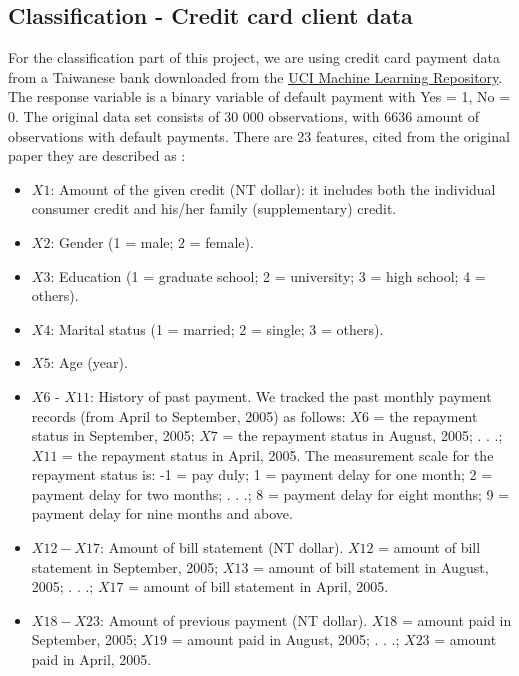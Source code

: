 \documentclass[a4paper, 11pt, twocolumn]{article}
\begin{document}
\subsection{Classification - Credit card client data}
For the classification part of this project,  we are using credit card payment
data from a Taiwanese bank downloaded from the \href{https://archive.ics.uci.edu/ml/datasets/default+of+credit+card+clients}{UCI Machine Learning Repository}. The
response variable is a binary variable of default payment with Yes = 1, No = 0.
The original data set consists of 30 000 observations, with 6636 amount of
observations with default payments. There are 23 features, cited
from the original paper they are described as \cite{origarticle}:
\begin{itemize}[leftmargin=5mm, itemsep=0pt,  parsep=1pt]
 \item $X1$: Amount of the given credit (NT dollar): it includes both the individual consumer credit and his/her family (supplementary) credit.
\item $X2$: Gender (1 = male; 2 = female).
\item $X3$: Education (1 = graduate school; 2 = university; 3 = high school; 4 = others).
\item $X4$: Marital status (1 = married; 2 = single; 3 = others).
\item $X5$: Age (year).
\item $X6$ - $X11$: History of past payment. We tracked the past monthly payment
records (from April to September, 2005) as follows: $X6$ = the repayment status in
September, 2005; $X7$ = the repayment status in August, 2005; . . .;$X11$ = the
repayment status in April, 2005. The measurement scale for the repayment status
is: -1 = pay duly; 1 = payment delay for one month; 2 = payment delay for two
months; . . .; 8 = payment delay for eight months; 9 = payment delay for nine
months and above.
\item $X12-X17$: Amount of bill statement (NT dollar). $X12$ = amount of bill
statement in September, 2005; $X13$ = amount of bill statement in August, 2005;
. . .; $X17$ = amount of bill statement in April, 2005.
\item $X18-X23$: Amount of previous payment (NT dollar). $X18$ = amount paid in
September, 2005; $X19$ = amount paid in August, 2005; . . .; $X23$ = amount paid in
April, 2005.
\end{itemize}
\end{document}
